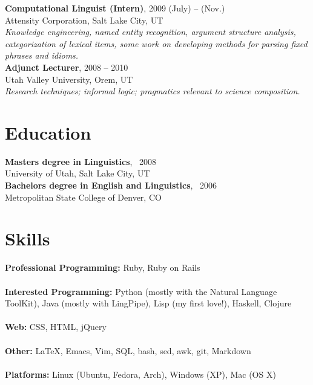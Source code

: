 \documentclass[margin,line]{resume}
\begin{document}
\begin{resume}
{\bf Computational Linguist (Intern)},  \hfill 2009 (July) -- (Nov.)\\
	Attensity Corporation, Salt Lake City, UT\\
	\textsl{Knowledge engineering, named entity recognition, argument structure analysis, categorization of lexical items, some work on developing methods for parsing fixed 												
					phrases and idioms.
					}\\
					
{\bf Adjunct Lecturer}, \hfill 2008 -- 2010\\
  Utah Valley University, Orem, UT\\
	\textsl{Research techniques; informal logic; pragmatics relevant to science composition.
						}

\section{Education}
{\bf Masters degree in Linguistics}, \ 2008\\ University of Utah, Salt Lake City, UT\\ %
{\bf Bachelors degree in English and Linguistics}, \  2006\\ Metropolitan State College of Denver, CO %

\section{Skills}
				{\bf Professional Programming:} Ruby, Ruby on Rails\\
				\\
        {\bf Interested Programming:} Python (mostly with the Natural Language ToolKit), Java (mostly with LingPipe), Lisp (my first love!), Haskell, Clojure\\
				\\
        {\bf Web:} CSS, HTML, jQuery\\
				\\
        {\bf Other:} \LaTeX, Emacs, Vim, SQL, bash, sed, awk, git, Markdown\\
				\\
        {\bf Platforms:} Linux (Ubuntu, Fedora, Arch), Windows (XP), Mac (OS X)

\end{resume}
\end{document}
